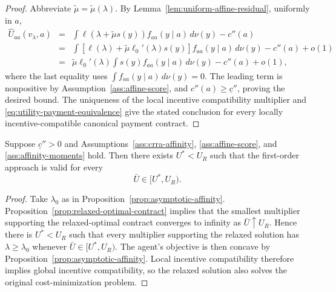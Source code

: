 \documentclass[12pt]{article}
\begin{document}
\begin{proof}
Abbreviate $\widetilde\mu=\widetilde\mu(\lambda)$.  By
Lemma~\ref{lem:uniform-affine-residual}, uniformly in $a$,
\begin{eqnarray*}
 \widehat U_{aa}(v_\lambda,a)
 &=& \int \ell(\lambda+\widetilde\mu s(y))
 f_{aa}(y\mid a)\,d\nu(y)-c''(a)\\
 &=& \int\left[\ell(\lambda)
 +\widetilde\mu\ell_0'(\lambda)s(y)\right]
 f_{aa}(y\mid a)\,d\nu(y)-c''(a)+o(1)\\
 &=& \widetilde\mu\ell_0'(\lambda)
 \int s(y)f_{aa}(y\mid a)\,d\nu(y)-c''(a)+o(1),
\end{eqnarray*}
where the last equality uses
$\int f_{aa}(y\mid a)\,d\nu(y)=0$.
The leading term is nonpositive by Assumption~\ref{ass:affine-score}, and
$c''(a)\geq\underline c''$, proving the desired bound.  The uniqueness of the
local incentive compatibility multiplier and
\eqref{eq:utility-payment-equivalence} give the stated conclusion for every
locally incentive-compatible canonical payment contract.
\end{proof}

\begin{corollary}
\label{cor:asymptotic-affinity-foa}
Suppose $\underline c''>0$ and Assumptions~\ref{ass:crra-affinity},
\ref{ass:affine-score}, and \ref{ass:affinity-moments} hold.  Then there exists
$U^*<U_R$ such that the first-order approach is valid for every
\[
    \bar U\in[U^*,U_R).
\]
\end{corollary}

\begin{proof}
Take $\lambda_0$ as in Proposition~\ref{prop:asymptotic-affinity}.
Proposition~\ref{prop:relaxed-optimal-contract} implies that the smallest
multiplier supporting the relaxed-optimal contract converges to infinity as
$\bar U\uparrow U_R$.  Hence there is $U^*<U_R$ such that every multiplier
supporting the relaxed solution has $\lambda\geq\lambda_0$ whenever
$\bar U\in[U^*,U_R)$.  The agent's objective is then concave by
Proposition~\ref{prop:asymptotic-affinity}.  Local incentive compatibility
therefore implies global incentive compatibility, so the relaxed solution
also solves the original cost-minimization problem.
\end{proof}
\end{document}
